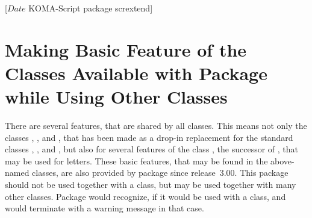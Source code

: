 %
%
%
%
%
%
%
%
% 
%
%
%
%

                 [$Date$
                  KOMA-Script package scrextend]


\chapter{Making Basic Feature of the \KOMAScript{} Classes Available with
  Package  while Using Other Classes}
\BeginIndexGroup%
%

There are several features, that are shared by all \KOMAScript{} classes. This
means not only the classes , , and
, that has been made as a drop-in replacement for the standard
classes , , and , but also for
several features of the \KOMAScript{} class , the successor of
, that may be used for letters. These basic features, that may
be found in the above-named classes, are also provided by package
 since \KOMAScript{} release~3.00. This package should not
be used together with a \KOMAScript{} class, but may be used together with
many other classes. Package  would recognize, if it would
be used with a \KOMAScript{} class, and would terminate with a warning message
in that case.

